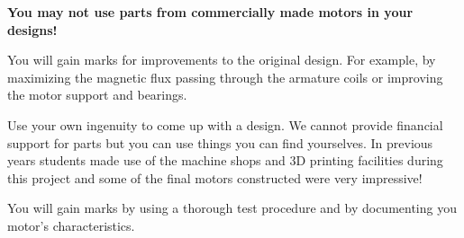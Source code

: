 \documentclass{instructions}
\begin{document}
\textbf{You may not use parts from commercially made motors in your
designs!}

You will gain marks for improvements to the original design. For
example, by maximizing the magnetic flux passing through the armature
coils or improving the motor support and bearings.

Use your own ingenuity to come up with a design. We cannot provide
financial support for parts but you can use things you can find
yourselves. In previous years students made use of the machine shops and
3D printing facilities during this project and some of the final motors
constructed were very impressive!

You will gain marks by using a thorough test procedure and by
documenting you motor's characteristics.
\end{document}
